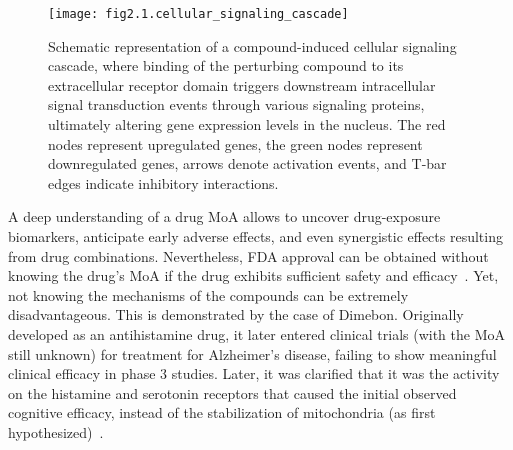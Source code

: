 \begin{figure}[htbp]
    \centering
    \texttt{[image: fig2.1.cellular\_signaling\_cascade]}
    \caption[Schematic representation of a compound-induced cellular signaling cascade.]{Schematic representation of a compound-induced cellular signaling cascade, where binding of the perturbing compound to its extracellular receptor domain triggers downstream intracellular signal transduction events through various signaling proteins, ultimately altering gene expression levels in the nucleus. The red nodes represent upregulated genes, the green nodes represent downregulated genes, arrows denote activation events, and T-bar edges indicate inhibitory interactions.}
    \label{fig:fig2.1.cellular_signaling_cascade}
\end{figure}


A deep understanding of a drug \gls{MoA} allows to uncover drug-exposure biomarkers, anticipate early adverse effects, and even synergistic effects resulting from drug combinations. 
Nevertheless, FDA approval can be obtained without knowing the drug's \gls{MoA} if the drug exhibits sufficient safety and efficacy~\cite{RN38, RN68}. 
Yet, not knowing the mechanisms of the compounds can be extremely disadvantageous. This is demonstrated by the case of Dimebon. 
Originally developed as an antihistamine drug, it later entered clinical trials (with the \gls{MoA} still unknown) for treatment for Alzheimer's disease, failing to show meaningful clinical efficacy in phase 3 studies. 
Later, it was clarified that it was the activity on the histamine and serotonin receptors that caused the initial observed cognitive efficacy, instead of the stabilization of mitochondria (as first hypothesized)~\cite{RN38, RN69}.

